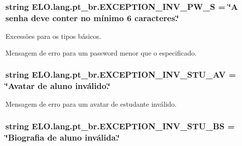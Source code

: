 \hypertarget{namespaceELO_1_1lang_1_1pt__br_a29c3f098306450c2e590fdf8cec9fbbc}{
\subsubsection[{E\-X\-C\-E\-P\-T\-I\-O\-N\-\_\-\-I\-N\-V\-\_\-\-P\-W\-\_\-\-S}]{\setlength{\rightskip}{0pt plus 5cm}string E\-L\-O.\-lang.\-pt\-\_\-br.\-E\-X\-C\-E\-P\-T\-I\-O\-N\-\_\-\-I\-N\-V\-\_\-\-P\-W\-\_\-\-S = \char`\"{}A senha deve conter no mínimo 6 caracteres.\char`\"{}}}\label{d5/d70/namespaceELO_1_1lang_1_1pt__br_a29c3f098306450c2e590fdf8cec9fbbc}


Excessões para os tipos básicos. 

Mensagem de erro para um password menor que o especificado. \hypertarget{namespaceELO_1_1lang_1_1pt__br_aabe31490486b05d4ed70d699bae1f413}{
\subsubsection[{E\-X\-C\-E\-P\-T\-I\-O\-N\-\_\-\-I\-N\-V\-\_\-\-S\-T\-U\-\_\-\-A\-V}]{\setlength{\rightskip}{0pt plus 5cm}string E\-L\-O.\-lang.\-pt\-\_\-br.\-E\-X\-C\-E\-P\-T\-I\-O\-N\-\_\-\-I\-N\-V\-\_\-\-S\-T\-U\-\_\-\-A\-V = \char`\"{}Avatar de aluno inválido.\char`\"{}}}\label{d5/d70/namespaceELO_1_1lang_1_1pt__br_aabe31490486b05d4ed70d699bae1f413}


Mensagem de erro para um avatar de estudante inválido. 

\hypertarget{namespaceELO_1_1lang_1_1pt__br_a0a02d44f930b2512d0c6c6427b7d4134}{
\subsubsection[{E\-X\-C\-E\-P\-T\-I\-O\-N\-\_\-\-I\-N\-V\-\_\-\-S\-T\-U\-\_\-\-B\-S}]{\setlength{\rightskip}{0pt plus 5cm}string E\-L\-O.\-lang.\-pt\-\_\-br.\-E\-X\-C\-E\-P\-T\-I\-O\-N\-\_\-\-I\-N\-V\-\_\-\-S\-T\-U\-\_\-\-B\-S = \char`\"{}Biografia de aluno inválida.\char`\"{}}}\label{d5/d70/namespaceELO_1_1lang_1_1pt__br_a0a02d44f930b2512d0c6c6427b7d4134}


